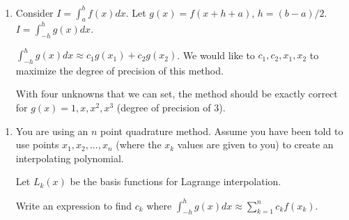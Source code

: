 \documentclass[12pt,letterpaper,noanswers]{exam}
\begin{document}
\begin{enumerate}[resume=classQ]
    \item Consider $I = \int_a^b f(x)dx$.  Let $g(x) = f(x+h+a)$, $h = (b-a)/2$.  $I = \int_{-h}^h g(x) dx$.
    
        $\int_{-h}^h g(x) dx \approx c_1 g(x_1) + c_2 g(x_2)$.  We would like to $c_1, c_2, x_1, x_2$ to maximize the degree of precision of this method.  
        
        With four unknowns that we can set, the method should be exactly correct for $g(x) = 1, x, x^2, x^3$ (degree of precision of $3$).
\end{enumerate}
\eject


\begin{enumerate}[resume=classQ]
\item You are using an $n$ point quadrature method.  Assume you have been told to use points $x_1, x_2, ..., x_n$ (where the $x_k$ values are given to you) to create an interpolating polynomial.

Let $L_k(x)$ be the basis functions for Lagrange interpolation.  

Write an expression to find $c_k$ where $\displaystyle\int_{-h}^h g(x) dx \approx \sum\limits_{k=1}^n c_k f(x_k)$.
\vspace{1in}

\end{enumerate}
\end{document}

